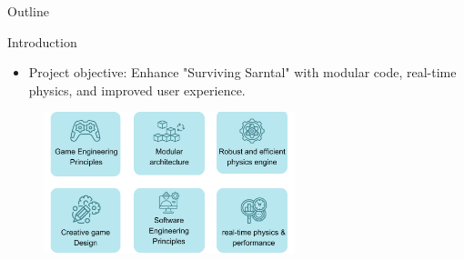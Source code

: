 \begin{frame}{Outline}
    \tableofcontents
\end{frame}


\begin{frame}{Introduction}
    \begin{itemize}
        \item Project objective: Enhance "Surviving Sarntal" with modular code, real-time physics, and improved user experience.
    \end{itemize}
    \centering
    \begin{figure}
        \includegraphics[width=0.65\textwidth]{../figures/focusPoints.png}
    \end{figure}
\end{frame}